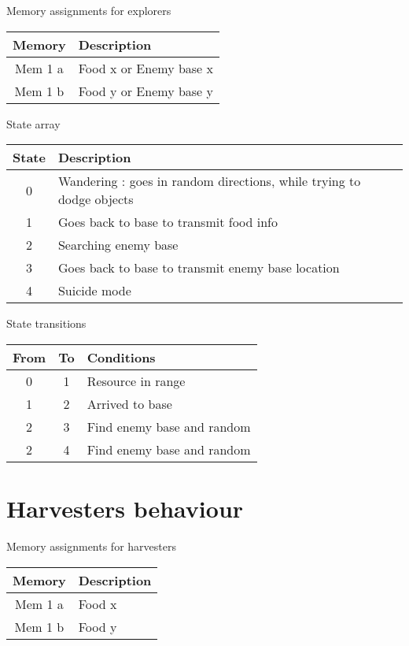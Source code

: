 \documentclass{article}
\begin{document}
\begin{table}[ht]
	Memory assignments for explorers\\
	\begin{tabular}{|c|l|}
		\hline
		Memory & Description\\
		\hline
		Mem 1 a & Food x or Enemy base x\\
		Mem 1 b & Food y or Enemy base y\\
		\hline
	\end{tabular}
\end{table}

\begin{table}[ht]
	State array\\
	\begin{tabular}{|c|l|}
		\hline
		State & Description \\
		\hline
		0 & Wandering : goes in random directions, while trying to dodge objects\\
		\hline
		1 & Goes back to base to transmit food info\\
		\hline
		2 & Searching enemy base\\
		\hline
		3 & Goes back to base to transmit enemy base location\\
		\hline
		4 & Suicide mode\\
		\hline
	\end{tabular}
\end{table}

\begin{table}[ht]
	State transitions\\
	\begin{tabular}{|c|c|l|}
		\hline
		From & To & Conditions\\
		\hline
		0 & 1 & Resource in range\\
		\hline
		1 & 2 & Arrived to base\\
		\hline
		2 & 3 & Find enemy base and random\\
		\hline
		2 & 4 & Find enemy base and random\\
		\hline
	\end{tabular}
\end{table}

\section{Harvesters behaviour}

\begin{table}[ht]
	Memory assignments for harvesters\\
	\begin{tabular}{|c|l|}
		\hline
		Memory & Description\\
		\hline
		Mem 1 a & Food x\\
		Mem 1 b & Food y\\
		\hline
	\end{tabular}
\end{table}
\end{document}
